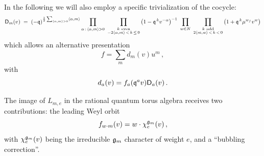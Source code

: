 \documentclass[12pt]{amsart}
\begin{document}
In the following we will also employ a specific trivialization of the cocycle:
\begin{equation}\label{eq:cocha}
	\mathsf{D}_m(v) \;=\;
	(-\mathfrak{q})^{\frac12\sum_{\langle\alpha,m\rangle>0}\langle\alpha,m\rangle}
	\prod_{\substack{\alpha \,:\, \langle\alpha,m\rangle>0}}\
	\prod_{\substack{k\ \mathrm{even}\\ -2\langle\alpha,m\rangle\,<\,k\,\le\,0}}
	\big(1-\mathfrak{q}^{\,k}v^{-\alpha}\big)^{-1}
	\ \prod_{w\in N}\
	\prod_{\substack{k\ \mathrm{odd}\\ 2\langle m,w\rangle\,<\,k\,<\,0}}
	\big(1+\mathfrak{q}^{\,k}\mu^{w_f} v^{w}\big)
\end{equation}
which allows an alternative presentation 
\begin{equation}
	f = \sum_m d_m(v) u^m \, ,
\end{equation}
with
\begin{equation}	
	d_a(v) = f_a(\mathfrak{q}^a v) \mathsf{D}_a(v) \, .
\end{equation}

The image of $L_{m,e}$ in the rational quantum torus algebra receives two contributions: the leading Weyl orbit
\begin{equation}
	f_{w\cdot m}(v) = w\cdot \chi^{\mathfrak{g}_m}_e(v) \, ,
\end{equation}
with $\chi^{\mathfrak{g}_m}_e(v)$ being the irreducible $\mathfrak{g}_m$ character of weight $e$, and a ``bubbling correction''.
\end{document}
